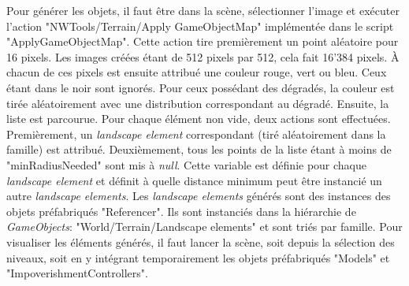 		\begin{minipage}{\linewidth}
			\label{LandscapeElementsMap}
		\end{minipage}\medskip
		
		Pour générer les objets, il faut être dans la scène, sélectionner l'image et exécuter l'action "NWTools/Terrain/Apply GameObjectMap" implémentée dans le script "ApplyGameObjectMap". Cette action tire premièrement un point aléatoire pour 16 pixels. Les images créées étant de 512 pixels par 512, cela fait 16'384 pixels. À chacun de ces pixels est ensuite attribué une couleur rouge, vert ou bleu. Ceux étant dans le noir sont ignorés. Pour ceux possédant des dégradés, la couleur est tirée aléatoirement avec une distribution correspondant au dégradé. Ensuite, la liste est parcourue. Pour chaque élément non vide, deux actions sont effectuées. Premièrement, un \textit{landscape element} correspondant (tiré aléatoirement dans la famille) est attribué. Deuxièmement, tous les points de la liste étant à moins de "minRadiusNeeded" sont mis à \textit{null}. Cette variable est définie pour chaque \textit{landscape element} et définit à quelle distance minimum peut être instancié un autre \textit{landscape elements}. Les \textit{landscape elements} générés sont des instances des objets préfabriqués "Referencer". Ils sont instanciés dans la hiérarchie de \textit{GameObjects}: "World/Terrain/Landscape elements" et sont triés par famille. Pour visualiser les éléments générés, il faut lancer la scène, soit depuis la sélection des niveaux, soit en y intégrant temporairement les objets préfabriqués "Models" et "ImpoverishmentControllers".
		
